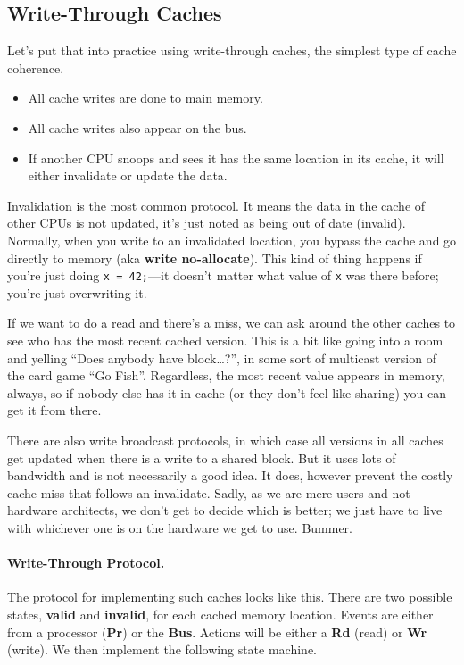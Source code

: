 \documentclass[a4paper]{report}
\begin{document}
\subsection*{Write-Through Caches}
Let's put that into practice using write-through caches, the simplest type of
cache coherence.
  \begin{itemize}
    \item All cache writes are done to main memory.
    \item All cache writes also appear on the bus.
    \item If another CPU snoops and sees it has the same location in
      its cache, it will either invalidate or update the
      data.
  \end{itemize}
  
Invalidation is the most common protocol. It means the data in the cache of other CPUs is not updated, it's just noted as being out of date (invalid).  Normally, when you write to an invalidated location, you bypass the cache and go directly to memory (aka {\bf write no-allocate}). This kind of thing happens if you're just doing \texttt{x = 42;}---it doesn't matter what value of \texttt{x} was there before; you're just overwriting it.

If we want to do a read and there's a miss, we can ask around the other caches to see who has the most recent cached version. This is a bit like going into a room and yelling ``Does anybody have block\ldots?'', in some sort of multicast version of the card game ``Go Fish''. Regardless, the most recent value appears in memory, always, so if nobody else has it in cache (or they don't feel like sharing) you can get it from there.

There are also write broadcast protocols, in which case all versions in all caches get updated when there is a write to a shared block. But it uses lots of bandwidth and is not necessarily a good idea. It does, however prevent the costly cache miss that follows an invalidate. Sadly, as we are mere users and not hardware architects, we don't get to decide which is better; we just have to live with whichever one is on the hardware we get to use. Bummer.

\paragraph{Write-Through Protocol.}
The protocol for implementing such caches looks like this.
There are two possible states, {\bf valid} and {\bf invalid}, for each cached memory location.
Events are either from a processor ({\bf Pr}) or the {\bf Bus}. Actions will be either a \textbf{Rd} (read) or \textbf{Wr} (write).
We then implement the following state machine.
\end{document}
